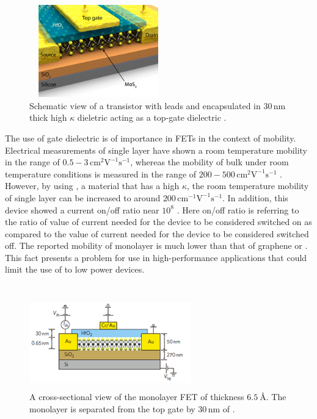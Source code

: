 \documentclass[%
 reprint,
 amsmath,amssymb,
 aps,
pra,
floatfix,
]{revtex4-1}
\begin{document}
\begin{figure}
\includegraphics[width=6cm,height=4cm]{../figs/mos2fet}
\caption{Schematic view of a  transistor with  leads and encapsulated in $30 \mathrm{\,nm}$ thick high $\kappa$ dieletric  acting as a top-gate dielectric \cite{Kis2011, Lembke2015}.}
\label{fig:mos2fet}
\end{figure}
The use of gate dielectric is of importance in FETs in the context of mobility. Electrical measurements of single layer  have shown a room temperature mobility in the range of $0.5-3\mathrm{\,cm^2}\mathrm{V}^{-1}\mathrm{s}^{-1}$, whereas the mobility of bulk  under room temperature conditions is measured in the range of $200-500\mathrm{\,cm}^{2}\mathrm{V}^{-1}\mathrm{s}^{-1}$ \cite{novoselovEtAl2005, Ghatak2011, Fivaz1967}. However, by using , a material that has a high $\kappa$, the room temperature mobility of single layer  can be increased to around $200 \mathrm{\,cm}^{-1}\mathrm{V}^{-1}\mathrm{s}^{-1}$. In addition, this device showed a current on/off ratio near $10^8$ \cite{Kis2011}. Here on/off ratio is referring to the ratio of value of current needed for the device to be considered switched on as compared to the value of current needed for the device to be considered switched off. The reported mobility of monolayer  is much lower than that of graphene or  \cite{Kim2011}. This fact presents a problem for use in high-performance applications that could limit the use of  to low power devices.\\ \\
\begin{figure}
\includegraphics[width=7cm, height=4cm]{../figs/mos2fetSchematic}
\caption{A cross-sectional view of the monolayer  FET of thickness $\SI{6.5}{\angstrom}$. The monolayer is separated from the top gate by $30\mathrm{\,nm}$ of  \cite{grapheneLike2Dreview2013}.}
\label{fig:mos2fetSchematic}
\end{figure}
\end{document}
